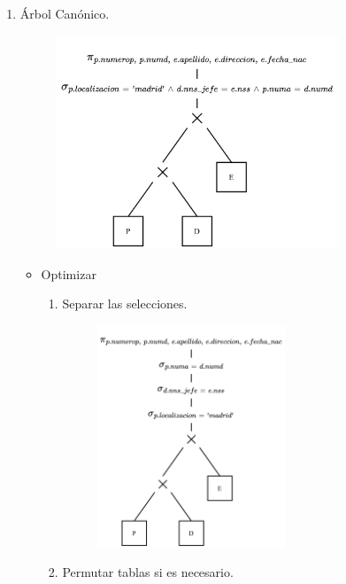 \documentclass{templateNote}
\begin{document}
\begin{enumerate}
    \newpage
    \item \'Arbol Can\'onico.
    \begin{figure}[H]
        \centering
        \includegraphics[width=0.8\textwidth]{img/E4-Canonico.png}
    \end{figure}

    \begin{itemize}
        \item Optimizar
        \begin{enumerate}
            \item Separar las selecciones.
            \begin{figure}[H]
                \centering
                \includegraphics[width=0.6\textwidth]{img/E4-Paso-1.png}
            \end{figure}

            \newpage
            \item Permutar tablas si es necesario.


\end{enumerate}
\end{itemize}
\end{enumerate}
\end{document}
